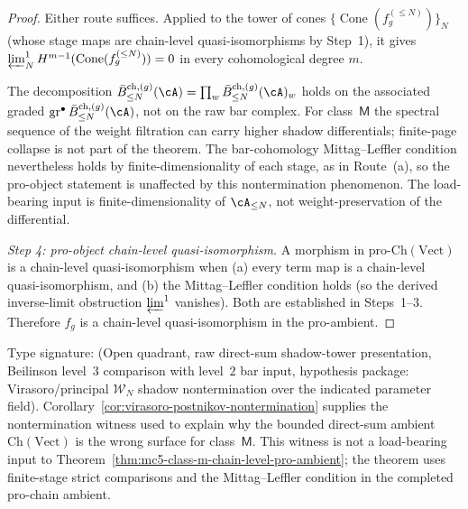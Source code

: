 \begin{proof}
Either route suffices. Applied to the tower of cones
$\{\operatorname{Cone}(f_g^{(\leq N)})\}_N$ \textup{(}whose stage maps
are chain-level quasi-isomorphisms by Step~1\textup{)}, it gives
$\varprojlim^1_N H^{m-1}(\operatorname{Cone}(f_g^{(\leq N)})) = 0$ in
every cohomological degree $m$.

\begin{remark}
\label{rem:mc5-weight-filtration}
%
The decomposition
$\bar B^{\mathrm{ch},(g)}_{\leq N}(\cA)
= \prod_{w} \bar B^{\mathrm{ch},(g)}_{\leq N}(\cA)_w$
holds on the associated graded
$\operatorname{gr}^{\bullet} \bar B^{\mathrm{ch},(g)}_{\leq N}(\cA)$,
not on the raw bar complex. For class~$\mathsf{M}$ the spectral
sequence of the weight filtration can carry higher shadow differentials;
finite-page collapse is not part of the theorem. The bar-cohomology
Mittag--Leffler condition nevertheless holds by finite-dimensionality
of each stage, as in Route~(a), so the pro-object statement is
unaffected by this nontermination phenomenon. The load-bearing input is
finite-dimensionality of $\cA_{\leq N}$, not weight-preservation of the
differential.
\end{remark}

\emph{Step 4: pro-object chain-level quasi-isomorphism.} A morphism in
$\mathrm{pro}\text{-}\mathrm{Ch}(\mathrm{Vect})$ is a chain-level
quasi-isomorphism when \textup{(a)} every term map is a chain-level
quasi-isomorphism, and \textup{(b)} the Mittag--Leffler condition holds
\textup{(}so the derived inverse-limit obstruction $\varprojlim^1$
vanishes\textup{)}. Both are established in Steps~1--3. Therefore $f_g$
is a chain-level quasi-isomorphism in the pro-ambient.
\end{proof}

\begin{remark}
\label{rem:mc5-class-m-nontermination-witness-conditional}
Type signature: \textup{(}Open quadrant, raw direct-sum shadow-tower
presentation, Beilinson level~$3$ comparison with level~$2$ bar input,
hypothesis package: Virasoro/principal $\mathcal W_N$ shadow
nontermination over the indicated parameter field\textup{)}.
Corollary~\textup{\ref{cor:virasoro-postnikov-nontermination}} supplies
the nontermination witness used to explain why the bounded direct-sum
ambient $\mathrm{Ch}(\mathrm{Vect})$ is the wrong surface for
class~$\mathsf M$. This witness is not a load-bearing input to
Theorem~\textup{\ref{thm:mc5-class-m-chain-level-pro-ambient}}; the
theorem uses finite-stage strict comparisons and the
Mittag--Leffler condition in the completed pro-chain ambient.
\end{remark}

